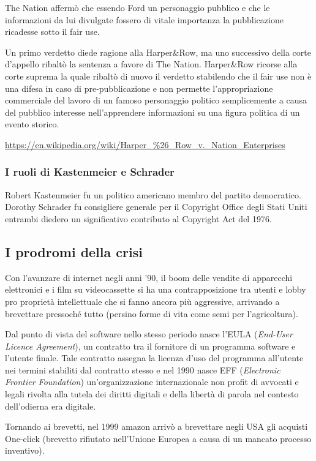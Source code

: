 The Nation affermò che essendo Ford un personaggio pubblico e che le informazioni da lui divulgate fossero di vitale importanza la pubblicazione ricadesse sotto il fair use.

Un primo verdetto diede ragione alla Harper\&Row, ma uno successivo
della corte d'appello ribaltò la sentenza a favore di The Nation. Harper\&Row ricorse alla corte suprema la quale ribaltò di nuovo il
verdetto stabilendo che il fair use non è una difesa in caso di  
pre-pubblicazione e non permette l'appropriazione commerciale del 
lavoro di un famoso personaggio politico semplicemente 
a causa del pubblico interesse nell'apprendere informazioni su una
figura politica di un evento storico.

\url{https://en.wikipedia.org/wiki/Harper_%26_Row_v._Nation_Enterprises}

\subsubsection{I ruoli di Kastenmeier e Schrader}

Robert Kastenmeier fu un politico americano membro del partito democratico. 
Dorothy Schrader fu consigliere generale per il Copyright Office degli Stati Uniti entrambi diedero un significativo contributo al Copyright Act del 1976.

\subsection{I prodromi della crisi}

Con l'avanzare di internet negli anni '90, il boom delle vendite di apparecchi elettronici e i film su videocassette si ha una contrapposizione tra utenti e lobby pro proprietà intellettuale che si fanno ancora più aggressive, arrivando a brevettare pressoché tutto (persino forme di vita come semi per l'agricoltura).

Dal punto di vista del software nello stesso periodo nasce l'EULA \left(\textit{End-User Licence Agreement}\right), un contratto tra il fornitore di un programma software e l'utente finale. Tale contratto assegna la licenza d'uso del programma all'utente nei termini stabiliti dal contratto stesso e nel 1990 nasce EFF \left(\textit{Electronic Frontier Foundation}\right) un'organizzazione internazionale non profit di avvocati e legali rivolta alla tutela dei diritti digitali e della libertà di parola nel contesto dell'odierna era digitale.

Tornando ai brevetti, nel 1999 amazon arrivò a brevettare negli USA gli acquisti One-click (brevetto rifiutato nell'Unione Europea a causa di un mancato processo inventivo).

